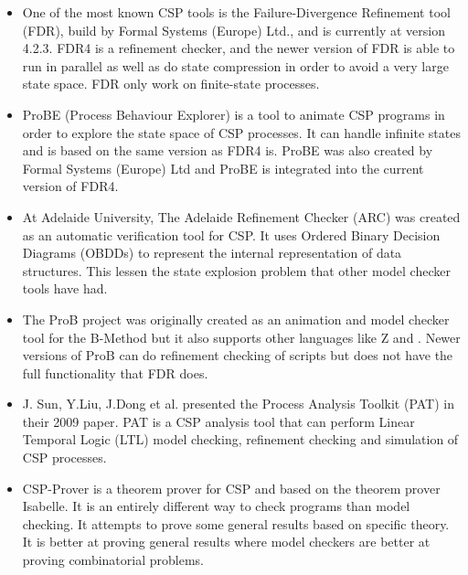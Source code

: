 \begin{itemize}
\item One of the most known CSP tools is the Failure-Divergence Refinement tool (FDR), build by Formal Systems (Europe) Ltd., and is currently at version 4.2.3\cite{fdr}. FDR4 is a refinement checker,
and the newer version of FDR is able to run in parallel as well as do state compression in order to avoid a very large state space. FDR only work on finite-state processes.
\item ProBE (Process Behaviour Explorer)\cite{probe} is a tool to animate CSP programs in order to explore the state space of CSP processes. It can handle infinite states and is based on the same \cspm{} version as FDR4 is. ProBE was also created by Formal Systems (Europe) Ltd and ProBE is integrated into the current version of FDR4.
\item At Adelaide University, The Adelaide Refinement Checker (ARC)\cite{Parashkevov1996} was created as an automatic verification tool for CSP. It uses Ordered Binary Decision Diagrams (OBDDs) to represent the internal representation of data structures. This lessen the state explosion problem that other model checker tools have had. 
\item The ProB project\cite{ProB}\cite{Leuschel2003} was originally created as an animation and model checker tool for the B-Method\cite{Abrial1988} but it also supports other languages like Z and \cspm{}. Newer versions of ProB can do refinement checking of \cspm{} scripts but does not have the full functionality that FDR does. 
\item J. Sun, Y.Liu, J.Dong et al. presented the Process Analysis Toolkit (PAT) in their 2009 paper\cite{Sun2009}. PAT is a CSP analysis tool that can perform Linear Temporal Logic (LTL) model checking, refinement checking and simulation of CSP processes. 
\item CSP-Prover\cite{Isobe2005} is a theorem prover for CSP and based on the theorem prover Isabelle. It is an entirely different way to check programs than model checking. It attempts to prove some general results based on specific theory. It is better at proving general results where model checkers are better at proving combinatorial problems. 
\end{itemize}
\\
